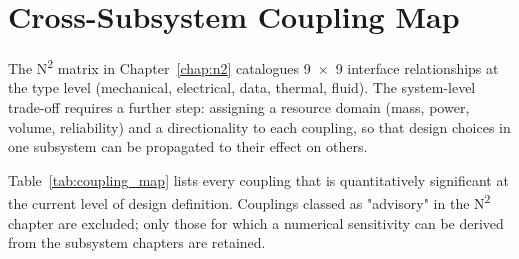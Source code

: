 
\section{Cross-Subsystem Coupling Map}
\label{sec:coupling_map}

The N\textsuperscript{2} matrix in Chapter~\ref{chap:n2} catalogues 9~$\times$~9 interface relationships at the type level (mechanical, electrical, data, thermal, fluid). The system-level trade-off requires a further step: assigning a resource domain (mass, power, volume, reliability) and a directionality to each coupling, so that design choices in one subsystem can be propagated to their effect on others.

Table~\ref{tab:coupling_map} lists every coupling that is quantitatively significant at the current level of design definition. Couplings classed as "advisory" in the N\textsuperscript{2} chapter are excluded; only those for which a numerical sensitivity can be derived from the subsystem chapters are retained.

\renewcommand{\arraystretch}{1.25}

